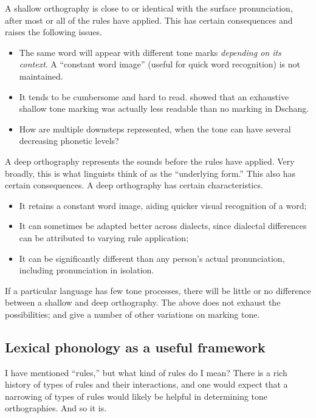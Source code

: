 \documentclass[output=paper]{langscibook}
\begin{document}
A shallow orthography is close to or identical with the surface pronunciation, after most or all of the rules have applied. This has certain consequences and raises the following issues.

\begin{itemize}
    \item The same word will appear with different tone marks \textit{depending on its context}. A “constant word image” (useful for quick word recognition) is not maintained.
    \item It tends to be cumbersome and hard to read. \citet{Bird1999a} showed that an exhaustive shallow tone marking was actually less readable than no marking in Dschang.
    \item How are multiple downsteps represented, when the tone can have several decreasing phonetic levels?
\end{itemize}


A deep orthography represents the sounds before the rules have applied. Very broadly, this is what linguists think of as the “underlying form.” This also has certain consequences. A deep orthography has certain characteristics.

\begin{itemize}
    \item It retains a constant word image, aiding quicker visual recognition of a word;
    \item It can sometimes be adapted better across dialects, since dialectal differences can be attributed to varying rule application;
    \item It can be significantly different than any person’s actual pronunciation, including pronunciation in isolation.
\end{itemize}

If a particular language has few tone processes, there will be little or no difference between a shallow and deep orthography. The above does not exhaust the possibilities; \citet{Bird1999b} and \citet{Roberts2013} give a number of other variations on marking tone.

\subsection{Lexical phonology as a useful framework}
\label{sec:PhonTheoryOrtho:LexicalPhonology:1}

I have mentioned “rules,” but what kind of rules do I mean? There is a rich history of types of rules and their interactions, and one would expect that a narrowing of types of rules would likely be helpful in determining tone orthographies. And so it is.
\end{document}
